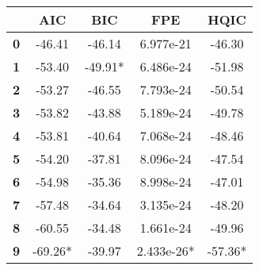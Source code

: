 \documentclass{report}
\begin{document}
\begin{center}
\begin{tabular}{lcccc}
\toprule
           & \textbf{AIC} & \textbf{BIC} & \textbf{FPE} & \textbf{HQIC}  \\
\midrule
\textbf{0} &      -46.41  &      -46.14  &   6.977e-21  &       -46.30   \\
\textbf{1} &      -53.40  &     -49.91*  &   6.486e-24  &       -51.98   \\
\textbf{2} &      -53.27  &      -46.55  &   7.793e-24  &       -50.54   \\
\textbf{3} &      -53.82  &      -43.88  &   5.189e-24  &       -49.78   \\
\textbf{4} &      -53.81  &      -40.64  &   7.068e-24  &       -48.46   \\
\textbf{5} &      -54.20  &      -37.81  &   8.096e-24  &       -47.54   \\
\textbf{6} &      -54.98  &      -35.36  &   8.998e-24  &       -47.01   \\
\textbf{7} &      -57.48  &      -34.64  &   3.135e-24  &       -48.20   \\
\textbf{8} &      -60.55  &      -34.48  &   1.661e-24  &       -49.96   \\
\textbf{9} &     -69.26*  &      -39.97  &  2.433e-26*  &      -57.36*   \\
\bottomrule
\end{tabular}
\end{center}
\end{document}

